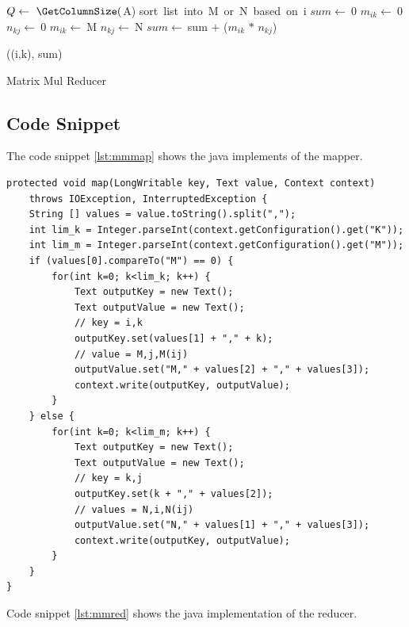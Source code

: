 \documentclass{article}
\begin{document}
\IncMargin{1em}
\begin{algorithm}[H]
\DontPrintSemicolon
{}
\BlankLine
$Q\leftarrow\ \GetColumnSize($A)\;
sort\ list\ into\ M\ or\ N\ based\ on\ i\;
$sum\leftarrow\ $0\;
 {
	$m_{ik}\leftarrow\ $0\;
	$n_{kj}\leftarrow\ $0\;
	 {
		$m_{ik}\leftarrow\ $M\big[K\big]
	}
	 {
		$n_{kj}\leftarrow\ $N\big[K\big]
	}
	$sum\leftarrow\ $sum $+$ ($m_{ik}$ $*$ $n_{kj}$)
}

\emit((i,k), sum)

\caption{Matrix Mul Reducer\label{algo:mmred}}
\end{algorithm}
\DecMargin{1em}

\subsection{Code Snippet}

The code snippet \ref{lst:mmmap} shows the java implements of the mapper.

\begin{lstlisting}[caption={Matrix multiplication mapper code snippet},label={lst:mmmap},style=MyJavaStyle]
protected void map(LongWritable key, Text value, Context context)
	throws IOException, InterruptedException {
	String [] values = value.toString().split(",");
	int lim_k = Integer.parseInt(context.getConfiguration().get("K"));
	int lim_m = Integer.parseInt(context.getConfiguration().get("M"));
	if (values[0].compareTo("M") == 0) {
		for(int k=0; k<lim_k; k++) {
			Text outputKey = new Text();
			Text outputValue = new Text();
			// key = i,k
			outputKey.set(values[1] + "," + k);
			// value = M,j,M(ij)
			outputValue.set("M," + values[2] + "," + values[3]);
			context.write(outputKey, outputValue);
		}
	} else {
		for(int k=0; k<lim_m; k++) {
			Text outputKey = new Text();
			Text outputValue = new Text();
			// key = k,j
			outputKey.set(k + "," + values[2]);
			// values = N,i,N(ij)
			outputValue.set("N," + values[1] + "," + values[3]);
			context.write(outputKey, outputValue);
		}
	}
}
\end{lstlisting}

Code snippet \ref{lst:mmred} shows the java implementation of the reducer.
\end{document}
